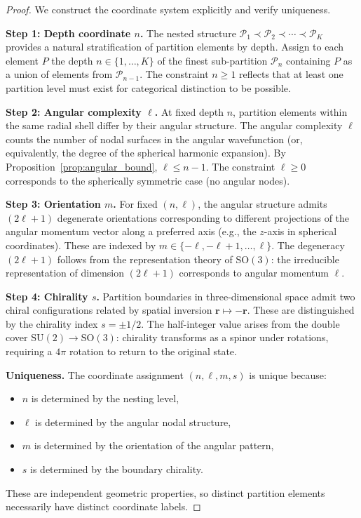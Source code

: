 \documentclass[twocolumn,10pt,a4paper]{article}
\theoremstyle{remark}
\newcommand{\partition}{\mathcal{P}}
\begin{document}
\begin{proof}
We construct the coordinate system explicitly and verify uniqueness.

\textbf{Step 1: Depth coordinate $n$.} The nested structure $\partition_1 \prec \partition_2 \prec \cdots \prec \partition_K$ provides a natural stratification of partition elements by depth. Assign to each element $P$ the depth $n \in \{1, \ldots, K\}$ of the finest sub-partition $\partition_n$ containing $P$ as a union of elements from $\partition_{n-1}$. The constraint $n \geq 1$ reflects that at least one partition level must exist for categorical distinction to be possible.

\textbf{Step 2: Angular complexity $\ell$.} At fixed depth $n$, partition elements within the same radial shell differ by their angular structure. The angular complexity $\ell$ counts the number of nodal surfaces in the angular wavefunction (or, equivalently, the degree of the spherical harmonic expansion). By Proposition~\ref{prop:angular_bound}, $\ell \leq n - 1$. The constraint $\ell \geq 0$ corresponds to the spherically symmetric case (no angular nodes).

\textbf{Step 3: Orientation $m$.} For fixed $(n, \ell)$, the angular structure admits $(2\ell + 1)$ degenerate orientations corresponding to different projections of the angular momentum vector along a preferred axis (e.g., the $z$-axis in spherical coordinates). These are indexed by $m \in \{-\ell, -\ell+1, \ldots, \ell\}$. The degeneracy $(2\ell + 1)$ follows from the representation theory of $\text{SO}(3)$: the irreducible representation of dimension $(2\ell + 1)$ corresponds to angular momentum $\ell$.

\textbf{Step 4: Chirality $s$.} Partition boundaries in three-dimensional space admit two chiral configurations related by spatial inversion $\mathbf{r} \mapsto -\mathbf{r}$. These are distinguished by the chirality index $s = \pm 1/2$. The half-integer value arises from the double cover $\text{SU}(2) \to \text{SO}(3)$: chirality transforms as a spinor under rotations, requiring a $4\pi$ rotation to return to the original state.

\textbf{Uniqueness.} The coordinate assignment $(n, \ell, m, s)$ is unique because:
\begin{itemize}[noitemsep]
    \item $n$ is determined by the nesting level,
    \item $\ell$ is determined by the angular nodal structure,
    \item $m$ is determined by the orientation of the angular pattern,
    \item $s$ is determined by the boundary chirality.
\end{itemize}
These are independent geometric properties, so distinct partition elements necessarily have distinct coordinate labels.


\end{proof}
\end{document}
